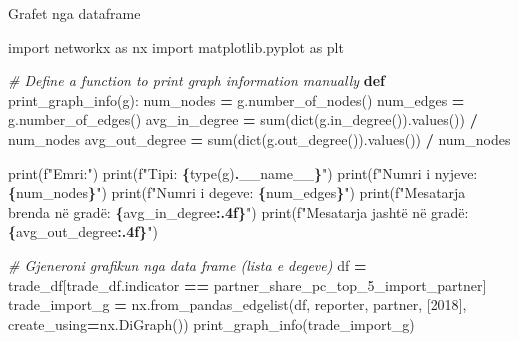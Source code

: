 \documentclass[
  ignorenonframetext,
]{beamer}
\newenvironment{Shaded}{\begin{snugshade}}{\end{snugshade}}
\newcommand{\BuiltInTok}[1]{#1}
\newcommand{\CommentTok}[1]{\textcolor[rgb]{0.56,0.35,0.01}{\textit{#1}}}
\newcommand{\ImportTok}[1]{#1}
\newcommand{\KeywordTok}[1]{\textcolor[rgb]{0.13,0.29,0.53}{\textbf{#1}}}
\newcommand{\NormalTok}[1]{#1}
\newcommand{\OperatorTok}[1]{\textcolor[rgb]{0.81,0.36,0.00}{\textbf{#1}}}
\newcommand{\SpecialCharTok}[1]{\textcolor[rgb]{0.81,0.36,0.00}{\textbf{#1}}}
\newcommand{\SpecialStringTok}[1]{\textcolor[rgb]{0.31,0.60,0.02}{#1}}
\newcommand{\StringTok}[1]{\textcolor[rgb]{0.31,0.60,0.02}{#1}}
\newcommand{\VariableTok}[1]{\textcolor[rgb]{0.00,0.00,0.00}{#1}}
\begin{document}
\begin{frame}[fragile]{Grafet nga dataframe}
\protect\hypertarget{grafet-nga-dataframe}{}

\begin{Shaded}
\begin{Highlighting}[]
\ImportTok{import}\NormalTok{ networkx }\ImportTok{as}\NormalTok{ nx}
\ImportTok{import}\NormalTok{ matplotlib.pyplot }\ImportTok{as}\NormalTok{ plt}

\CommentTok{\# Define a function to print graph information manually}
\KeywordTok{def}\NormalTok{ print\_graph\_info(g):}
\NormalTok{    num\_nodes }\OperatorTok{=}\NormalTok{ g.number\_of\_nodes()}
\NormalTok{    num\_edges }\OperatorTok{=}\NormalTok{ g.number\_of\_edges()}
\NormalTok{    avg\_in\_degree }\OperatorTok{=} \BuiltInTok{sum}\NormalTok{(}\BuiltInTok{dict}\NormalTok{(g.in\_degree()).values()) }\OperatorTok{/}\NormalTok{ num\_nodes}
\NormalTok{    avg\_out\_degree }\OperatorTok{=} \BuiltInTok{sum}\NormalTok{(}\BuiltInTok{dict}\NormalTok{(g.out\_degree()).values()) }\OperatorTok{/}\NormalTok{ num\_nodes}

    \BuiltInTok{print}\NormalTok{(}\SpecialStringTok{f"Emri:"}\NormalTok{)}
    \BuiltInTok{print}\NormalTok{(}\SpecialStringTok{f"Tipi: }\SpecialCharTok{\{}\BuiltInTok{type}\NormalTok{(g)}\SpecialCharTok{.}\VariableTok{\_\_name\_\_}\SpecialCharTok{\}}\SpecialStringTok{"}\NormalTok{)}
    \BuiltInTok{print}\NormalTok{(}\SpecialStringTok{f"Numri i nyjeve: }\SpecialCharTok{\{}\NormalTok{num\_nodes}\SpecialCharTok{\}}\SpecialStringTok{"}\NormalTok{)}
    \BuiltInTok{print}\NormalTok{(}\SpecialStringTok{f"Numri i degeve: }\SpecialCharTok{\{}\NormalTok{num\_edges}\SpecialCharTok{\}}\SpecialStringTok{"}\NormalTok{)}
    \BuiltInTok{print}\NormalTok{(}\SpecialStringTok{f"Mesatarja brenda në gradë: }\SpecialCharTok{\{}\NormalTok{avg\_in\_degree}\SpecialCharTok{:.4f\}}\SpecialStringTok{"}\NormalTok{)}
    \BuiltInTok{print}\NormalTok{(}\SpecialStringTok{f"Mesatarja jashtë në gradë: }\SpecialCharTok{\{}\NormalTok{avg\_out\_degree}\SpecialCharTok{:.4f\}}\SpecialStringTok{"}\NormalTok{)}

\CommentTok{\# Gjeneroni grafikun nga data frame (lista e degeve)}
\NormalTok{df }\OperatorTok{=}\NormalTok{ trade\_df[trade\_df.indicator }\OperatorTok{==} \StringTok{\textquotesingle{}partner\_share\_pc\_top\_5\_import\_partner\textquotesingle{}}\NormalTok{]}
\NormalTok{trade\_import\_g }\OperatorTok{=}\NormalTok{ nx.from\_pandas\_edgelist(df, }\StringTok{\textquotesingle{}reporter\textquotesingle{}}\NormalTok{, }\StringTok{\textquotesingle{}partner\textquotesingle{}}\NormalTok{, [}\StringTok{\textquotesingle{}2018\textquotesingle{}}\NormalTok{], create\_using}\OperatorTok{=}\NormalTok{nx.DiGraph())}
\NormalTok{print\_graph\_info(trade\_import\_g)}
\end{Highlighting}
\end{Shaded}
\end{frame}
\end{document}
